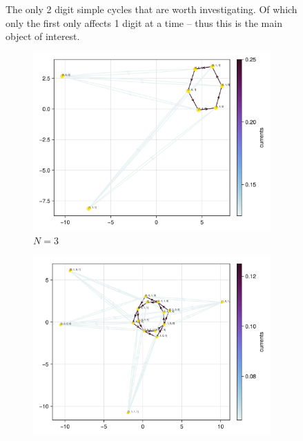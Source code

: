 \documentclass[11pt]{article}
\theoremstyle{nothm}
\begin{document}
\begin{tcolorbox}
\begin{figure}[H]
\begin{subfigure}[t]{0.2\textwidth}
            \caption{}
        \end{subfigure}
        \caption{
            The only 2 digit simple cycles that are worth investigating.
            Of which only the first only affects 1 digit at a time -- thus this is the main object of interest.
        }\label{fig:2dint}
    \end{figure}
\end{tcolorbox}

\begin{tcolorbox}
    \begin{figure}[H]
        \centering
        \begin{subfigure}[t]{0.49\textwidth}
            \centering
            \includegraphics[width=\textwidth]{../../plots/ones/c1/spring_N=3_metadata=(chash=5795298381321907906,ctype=simple).png}
            \caption{$N=3$}
        \end{subfigure}
        \begin{subfigure}[t]{0.49\textwidth}
            \centering
            \includegraphics[width=\textwidth]{../../plots/ones/c1/spring_N=4_metadata=(chash=5795298381321907906,ctype=simple).png}

\end{subfigure}
\end{figure}
\end{tcolorbox}
\end{document}
